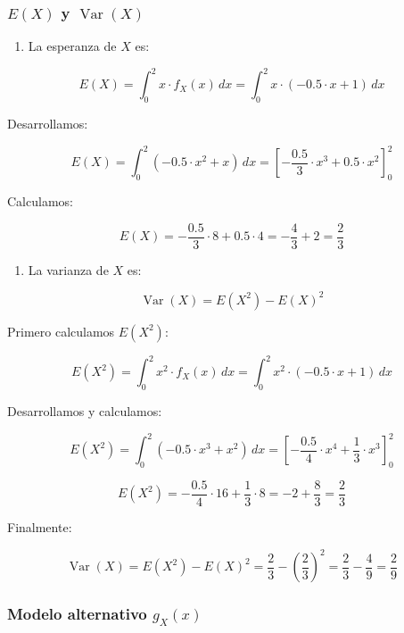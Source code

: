 \documentclass[
]{article}
\providecommand{\tightlist}{%
  \setlength{\itemsep}{0pt}\setlength{\parskip}{0pt}}
\begin{document}
\subsubsection{\texorpdfstring{\(E(X)\) y \(\operatorname{Var}(X)\)}{E(X) y \textbackslash operatorname\{Var\}(X)}}\label{ex-y-operatornamevarx}

\begin{enumerate}
\def\labelenumi{\arabic{enumi}.}
\tightlist
\item
  La esperanza de \(X\) es:
\end{enumerate}

\[
E(X) = \int_0^2 x \cdot f_X(x) \, dx = \int_0^2 x \cdot (-0.5 \cdot x + 1) \, dx
\]

Desarrollamos:

\[
E(X) = \int_0^2 (-0.5 \cdot x^2 + x) \, dx = \left[-\frac{0.5}{3} \cdot x^3 + 0.5 \cdot x^2\right]_0^2
\]

Calculamos:

\[
E(X) = -\frac{0.5}{3} \cdot 8 + 0.5 \cdot 4 = -\frac{4}{3} + 2 = \frac{2}{3}
\]

\begin{enumerate}
\def\labelenumi{\arabic{enumi}.}
\setcounter{enumi}{1}
\tightlist
\item
  La varianza de \(X\) es:
\end{enumerate}

\[
\operatorname{Var}(X) = E(X^2) - E(X)^2
\]

Primero calculamos \(E(X^2)\):

\[
E(X^2) = \int_0^2 x^2 \cdot f_X(x) \, dx = \int_0^2 x^2 \cdot (-0.5 \cdot x + 1) \, dx
\]

Desarrollamos y calculamos:

\[
E(X^2) = \int_0^2 (-0.5 \cdot x^3 + x^2) \, dx = \left[-\frac{0.5}{4} \cdot x^4 + \frac{1}{3} \cdot x^3\right]_0^2
\]

\[
E(X^2) = -\frac{0.5}{4} \cdot 16 + \frac{1}{3} \cdot 8 = -2 + \frac{8}{3} = \frac{2}{3}
\]

Finalmente:

\[
\operatorname{Var}(X) = E(X^2) - E(X)^2 = \frac{2}{3} - \left(\frac{2}{3}\right)^2 = \frac{2}{3} - \frac{4}{9} = \frac{2}{9}
\]

\subsubsection{\texorpdfstring{Modelo alternativo \(g_X(x)\)}{Modelo alternativo g\_X(x)}}\label{modelo-alternativo-g_xx}
\end{document}

